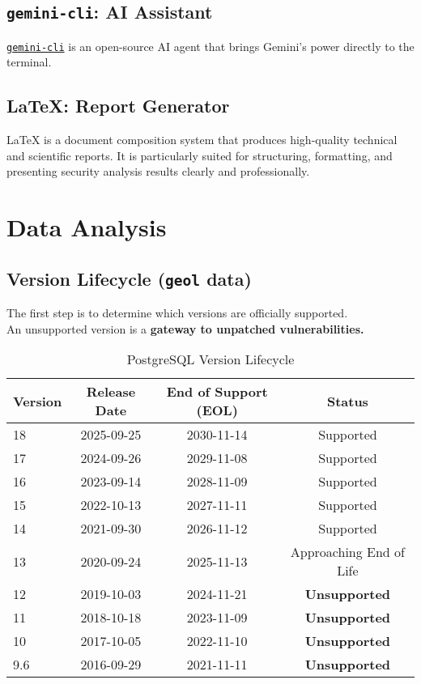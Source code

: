 \documentclass[11pt, a4paper]{article}
\begin{document}
\subsection{\texttt{gemini-cli}: AI Assistant}
\href{https://github.com/google-gemini/gemini-cli}{\texttt{gemini-cli}} is an open-source AI agent that brings Gemini's power directly to the terminal.

\subsection{\LaTeX{}: Report Generator}

\LaTeX{} is a document composition system that produces high-quality technical and scientific reports. It is particularly suited for structuring, formatting, and presenting security analysis results clearly and professionally.

\newpage

\section{Data Analysis}

\subsection{Version Lifecycle (\texttt{geol} data)}

The first step is to determine which versions are officially supported.\\

An unsupported version is a \textbf{gateway to unpatched vulnerabilities.}

\begin{table}[h!]
\centering
\caption{PostgreSQL Version Lifecycle}
\label{tab:geol}
\begin{tabular}{@{}lccc@{}}
	
	\textbf{Version} & \textbf{Release Date} & \textbf{End of Support (EOL)} & \textbf{Status} \\ \midrule
\rowcolor{lightgreen} 18 & 2025-09-25 & 2030-11-14 & Supported \\
\rowcolor{lightgreen} 17 & 2024-09-26 & 2029-11-08 & Supported \\
\rowcolor{lightgreen} 16 & 2023-09-14 & 2028-11-09 & Supported \\
\rowcolor{lightgreen} 15 & 2022-10-13 & 2027-11-11 & Supported \\
\rowcolor{lightgreen} 14 & 2021-09-30 & 2026-11-12 & Supported \\
\rowcolor{lightorange} 13 & 2020-09-24 & 2025-11-13 & Approaching End of Life \\ \midrule
\rowcolor{lightred} 12 & 2019-10-03 & 2024-11-21 & \textbf{Unsupported} \\
\rowcolor{lightred} 11 & 2018-10-18 & 2023-11-09 & \textbf{Unsupported} \\
\rowcolor{lightred} 10 & 2017-10-05 & 2022-11-10 & \textbf{Unsupported} \\
\rowcolor{lightred} 9.6 & 2016-09-29 & 2021-11-11 & \textbf{Unsupported} \\ \bottomrule
\end{tabular}
\end{table}
\end{document}
